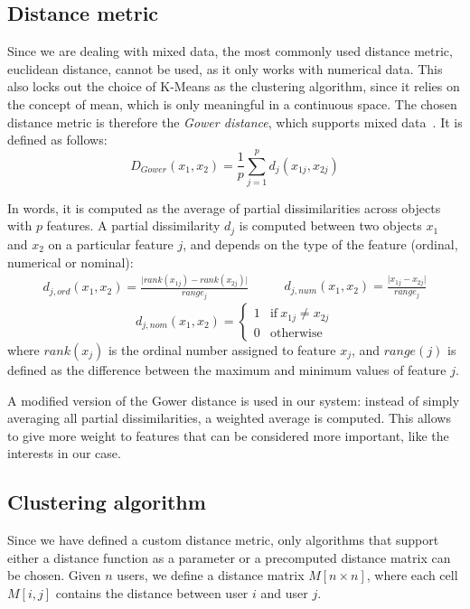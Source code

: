 \subsection{Distance metric}
\label{subsec:distance_metric}
Since we are dealing with mixed data, the most commonly used distance metric, euclidean distance, cannot be used, as it only works with numerical data. This also locks out the choice of K-Means as the clustering algorithm, since it relies on the concept of mean, which is only meaningful in a continuous space. The chosen distance metric is therefore the \emph{Gower distance}, which supports mixed data~\cite{tuerhong2014gower}. It is defined as follows:
\begin{equation*}
    D_{Gower}(x_1,x_2)=\frac{1}{p}\sum_{j=1}^{p}d_j(x_{1j},x_{2j})
\end{equation*}

In words, it is computed as the average of partial dissimilarities across objects with $p$ features. A partial dissimilarity $d_j$ is computed between two objects $x_1$ and $x_2$ on a particular feature $j$, and depends on the type of the feature (ordinal, numerical or nominal):
\begin{equation*}
    \begin{split}
        d_{j,ord}(x_1,x_2)=\frac{\lvert rank(x_{1j})-rank(x_{2j})\rvert}{range_j}
    \end{split}
    \qquad
    \begin{split}
        d_{j,num}(x_1,x_2)=\frac{\lvert x_{1j}-x_{2j}\rvert}{range_j}
    \end{split}
    \end{equation*}
    \begin{equation*}
        d_{j,nom}(x_1,x_2)=
        \begin{cases}
            1 & \text{if}\ x_{1j}\neq x_{2j} \\
            0 & \text{otherwise}
        \end{cases}
\end{equation*}
where $rank(x_j)$ is the ordinal number assigned to feature $x_j$, and $range(j)$ is defined as the difference between the maximum and minimum values of feature $j$.

A modified version of the Gower distance is used in our system: instead of simply averaging all partial dissimilarities, a weighted average is computed. This allows to give more weight to features that can be considered more important, like the interests in our case.

\subsection{Clustering algorithm}
Since we have defined a custom distance metric, only algorithms that support either a distance function as a parameter or a precomputed distance matrix can be chosen. Given $n$ users, we define a distance matrix $M[n\times n]$, where each cell $M[i,j]$ contains the distance between user $i$ and user $j$.


